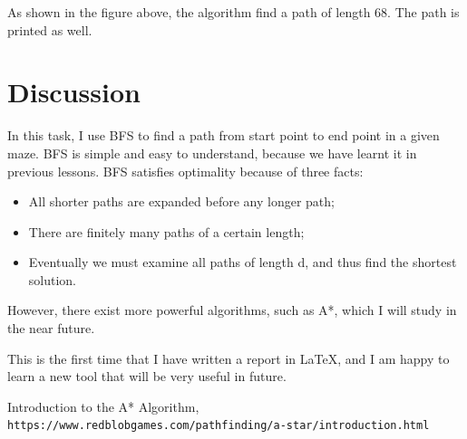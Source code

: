\documentclass[a4paper, 11pt]{article}
\begin{document}
As shown in the figure above, the algorithm find a path of length 68. The path is printed as well.

\section{Discussion}
In this task, I use BFS to find a path from start point to end point in a given maze. BFS is simple and easy to understand, because we have learnt it in previous lessons. BFS satisfies optimality because of three facts:
\begin{itemize}
\item All shorter paths are expanded before any longer path;
\item There are finitely many paths of a certain length;
\item Eventually we must examine all paths of length d, and thus find the shortest solution.
\end{itemize}

However, there exist more powerful algorithms, such as A*, which I will study in the near future.

This is the first time that I have written a report in \LaTeX, and I am happy to learn a new tool that will be very useful in future.

\begin{thebibliography}{9}
Introduction to the A* Algorithm,
\\\texttt{https://www.redblobgames.com/pathfinding/a-star/introduction.html}
\end{thebibliography}
\end{document}
